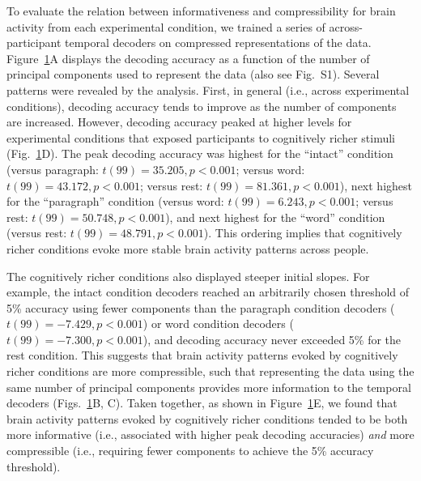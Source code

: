 \documentclass[english, 11pt]{article}
\newcommand{\varExplained}{S1}
\begin{document}
\begin{figure}[tp]
\label{fig:inflection}
\end{figure}

To evaluate the relation between informativeness and compressibility for brain
activity from each experimental condition, we trained a series of
across-participant temporal decoders on compressed representations of the data.
Figure~\ref{fig:inflection}A displays the decoding accuracy as a function of
the number of principal components used to represent the data (also see
Fig.~\varExplained). Several patterns were revealed by the analysis. First, in
general (i.e., across experimental conditions), decoding accuracy tends to
improve as the number of components are increased. However, decoding accuracy
peaked at higher levels for experimental conditions that exposed participants
to cognitively richer stimuli (Fig.~\ref{fig:inflection}D). The peak decoding
accuracy was highest for the ``intact'' condition (versus paragraph: $t(99) =
35.205, p < 0.001$; versus word: $t(99) = 43.172, p < 0.001$; versus rest:
$t(99) = 81.361, p < 0.001$), next highest for the ``paragraph'' condition
(versus word: $t(99) = 6.243, p < 0.001$; versus rest: $t(99) = 50.748, p <
0.001$), and next highest for the ``word'' condition (versus rest: $t(99) =
48.791, p < 0.001$). This ordering implies that cognitively richer conditions
evoke more stable brain activity patterns across people.

The cognitively richer conditions also displayed steeper initial slopes. For
example, the intact condition decoders reached an arbitrarily chosen threshold
of 5\% accuracy using fewer components than the paragraph condition decoders
($t(99) = -7.429, p < 0.001$) or word condition decoders ($t(99) = -7.300, p <
0.001$), and decoding accuracy never exceeded 5\% for the rest condition. This
suggests that brain activity patterns evoked by cognitively richer conditions
are more compressible, such that representing the data using the same number of
principal components provides more information to the temporal decoders
(Figs.~\ref{fig:inflection}B, C). Taken together, as shown in
Figure~\ref{fig:inflection}E, we found that brain activity patterns evoked by
cognitively richer conditions tended to be both more informative (i.e.,
associated with higher peak decoding accuracies) \textit{and} more compressible
(i.e., requiring fewer components to achieve the 5\% accuracy threshold).
\end{document}
